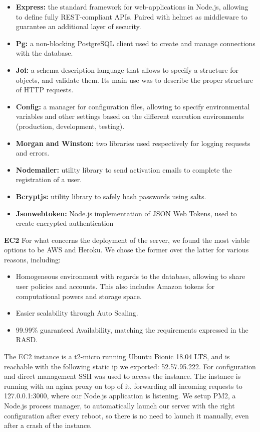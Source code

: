 \documentclass[titlepage]{article}
\begin{document}
	\begin{itemize}
		\item {\bf Express:}
		the standard framework for web-applications in Node.js, allowing to define fully REST-compliant
		APIs. Paired with helmet as middleware to guarantee an additional layer of security.
		\item {\bf Pg:}
		a non-blocking PostgreSQL client used to create and manage connections with the database.
		\item {\bf Joi:}
		a schema description language that allows to specify a structure for objects, and validate them. Its main use was to describe the proper structure of HTTP requests.
		\item {\bf Config:} 
		a manager for configuration files, allowing to specify environmental variables and other settings based on the different execution environments (production, development, testing).
		\item {\bf Morgan and Winston:}
		two libraries used respectively for logging requests and errors.
		\item {\bf Nodemailer:}
		utility library to send activation emails to complete the registration of a user.
		\item {\bf Bcryptjs:}
		utility library to safely hash passwords using salts.
		\item {\bf Jsonwebtoken:}
		Node.js implementation of JSON Web Tokens, used to create encrypted authentication
	\end{itemize}
	\noindent
	{\bf EC2} \newline
	For what concerns the deployment of the server, we found the most viable options to be AWS and Heroku. We chose the former over the latter for various reasons, including:
	\begin{itemize}
		\item {Homogeneous environment with regards to the database, allowing to share user policies and accounts. This also includes Amazon tokens for computational powers and storage space.}
		\item{Easier scalability through Auto Scaling.}
		\item{99.99\% guaranteed Availability, matching the requirements expressed in the RASD.}
	\end{itemize}
	The EC2 instance is a t2-micro running Ubuntu Bionic 18.04 LTS, and is reachable with the following static ip we exported: 52.57.95.222. For configuration and direct management SSH was used to access the instance.
	\newline
	The instance is running with an nginx proxy on top of it, forwarding all incoming requests to 127.0.0.1:3000, where our Node.js application is listening. 
	\newline
	We setup PM2, a Node.js process manager, to automatically launch our server with the right configuration after every reboot, so there is no need to launch it manually, even after a crash of the instance.
	
\end{document}
